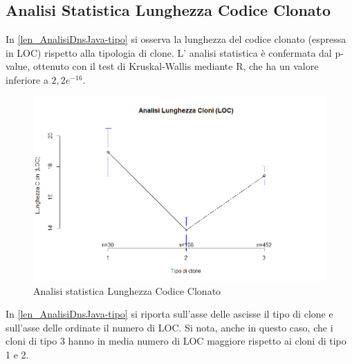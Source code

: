\subsection{Analisi Statistica Lunghezza Codice Clonato}
In \autoref{len_AnalisiDnsJava-tipo} si osserva la lunghezza del codice clonato (espressa in LOC) rispetto alla tipologia di clone. L' analisi statistica è confermata dal p-value, ottenuto con il test di Kruskal-Wallis mediante R, che ha un valore inferiore a $2,2 e^{-16}$. \newpage
\begin{figure}[htbp]
	\centering
	\includegraphics[scale=0.5]{analisi_R/AnalisiDnsJava/3-gplot-len-type.png}
\caption{Analisi statistica Lunghezza Codice Clonato }
\label{len_AnalisiDnsJava-tipo}
\end{figure}
In \autoref{len_AnalisiDnsJava-tipo} si riporta sull'asse delle ascisse il tipo di clone e sull'asse delle ordinate il numero di LOC. Si nota, anche in questo caso, che i cloni di tipo 3 hanno in media numero di LOC maggiore rispetto ai cloni di tipo 1 e 2.